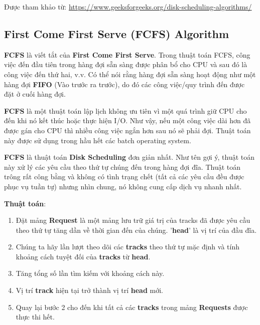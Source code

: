 \documentclass{report}
\begin{document}
    Được tham khảo từ: \href{https://www.geeksforgeeks.org/disk-scheduling-algorithms/}{https://www.geeksforgeeks.org/disk-scheduling-algorithms/}
        
    \subsection{First Come First Serve (FCFS) Algorithm}

    \textbf{FCFS} là viết tắt của \textbf{First Come First Serve}. Trong thuật toán FCFS, công việc đến đầu tiên trong hàng đợi sẵn sàng được phân bổ cho CPU và sau đó là công việc đến thứ hai, v.v. Có thể nói rằng hàng đợi sẵn sàng hoạt động như một hàng đợi \textbf{FIFO} (Vào trước ra trước), do đó các công việc/quy trình đến được đặt ở cuối hàng đợi.  

    \textbf{FCFS} là một thuật toán lập lịch không ưu tiên vì một quá trình giữ CPU cho đến khi nó kết thúc hoặc thực hiện I/O. Như vậy, nếu một công việc dài hơn đã được gán cho CPU thì nhiều công việc ngắn hơn sau nó sẽ phải đợi. Thuật toán này được sử dụng trong hầu hết các batch operating system. 

    \textbf{FCFS} là thuật toán \textbf{Disk Scheduling} đơn giản nhất. Như tên gợi ý, thuật toán này xử lý các yêu cầu theo thứ tự chúng đến trong hàng đợi đĩa. Thuật toán trông rất công bằng và không có tình trạng chết (tất cả các yêu cầu đều được phục vụ tuần tự) nhưng nhìn chung, nó không cung cấp dịch vụ nhanh nhất.

    \textbf{Thuật toán}: 
    \begin{enumerate}
        \item 
            Đặt mảng \textbf{Request} là một mảng lưu trữ giá trị của tracks đã được yêu cầu theo thứ tự tăng dần về thời gian đến của chúng. '\textbf{head}' là vị trí của đầu đĩa.
    
        \item 
            Chúng ta hãy lần lượt theo dõi các \textbf{tracks} theo thứ tự mặc định và tính khoảng cách tuyệt đối của \textbf{tracks} từ \textbf{head}.
        \item 
            Tăng tổng số lần tìm kiếm với khoảng cách này.
        \item 
            Vị trí \textbf{track} hiện tại trở thành vị trí \textbf{head} mới.
        \item 
            Quay lại bước 2 cho đến khi tất cả các \textbf{tracks} trong mảng \textbf{Requests} được thực thi hết.
    \end{enumerate}
\end{document}

